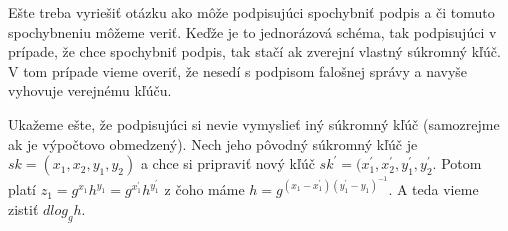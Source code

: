 Ešte treba vyriešiť otázku ako môže podpisujúci spochybniť podpis 
a či tomuto spochybneniu môžeme veriť.
Keďže je to jednorázová schéma, tak podpisujúci v prípade,
že chce spochybniť podpis, tak stačí ak zverejní vlastný súkromný kľúč.
V tom prípade vieme overiť, že nesedí s podpisom falošnej správy
a navyše vyhovuje verejnému kľúču.

Ukažeme ešte, že podpisujúci si nevie vymyslieť iný súkromný kľúč
(samozrejme ak je výpočtovo obmedzený). 
Nech jeho pôvodný súkromný kľúč je $sk = (x_1, x_2, y_1, y_2)$ a
chce si pripraviť nový kľúč $sk^{'} = (x_1^{'}, x_2^{'}, y_1^{'}, y_2^{'}$.
Potom platí $z_1 = g^{x_1} h^{y_1} = g^{x_1^{'}} h^{y_1^{'}}$ z čoho máme 
$h = g^{(x_1 - x_1^{'})(y_1^{'} - y_1)^{-1}}$.
A teda vieme zistiť $dlog_g h$.

